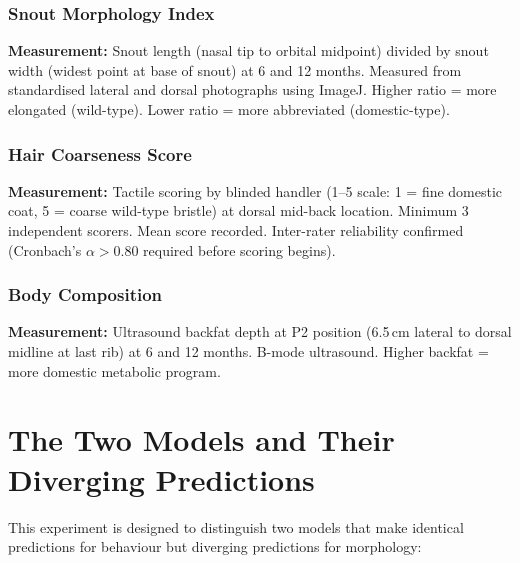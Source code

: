 \documentclass[10pt, a4paper]{article}
\begin{document}
\subsubsection{Snout Morphology Index}

\textbf{Measurement:} Snout length (nasal tip
to orbital midpoint) divided by snout width
(widest point at base of snout) at 6 and 12
months. Measured from standardised lateral
and dorsal photographs using ImageJ.
Higher ratio = more elongated (wild-type).
Lower ratio = more abbreviated (domestic-type).

\subsubsection{Hair Coarseness Score}

\textbf{Measurement:} Tactile scoring by
blinded handler (1--5 scale: 1 = fine domestic
coat, 5 = coarse wild-type bristle) at dorsal
mid-back location. Minimum 3 independent
scorers. Mean score recorded. Inter-rater
reliability confirmed (Cronbach's $\alpha
> 0.80$ required before scoring begins).

\subsubsection{Body Composition}

\textbf{Measurement:} Ultrasound backfat depth
at P2 position (6.5\,cm lateral to dorsal
midline at last rib) at 6 and 12 months.
B-mode ultrasound. Higher backfat = more
domestic metabolic program.

\section{The Two Models and Their Diverging
Predictions}
\label{sec:models}

This experiment is designed to distinguish
two models that make identical predictions for
behaviour but diverging predictions for morphology:
\end{document}
